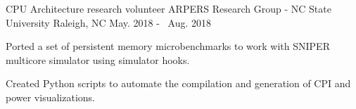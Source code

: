 \par\addvspace{-0.5ex}


\begin{cventries}

  \cventry
    {CPU Architecture research volunteer} %
    {ARPERS Research Group - NC State University} %
    {Raleigh, NC} %
    {\color{darkgray}May. 2018 - \ Aug. 2018} %
    {
      \begin{cvitems} %
        \item {Ported a set of persistent memory microbenchmarks to work with SNIPER multicore simulator using simulator hooks.}
        \item {Created Python scripts to automate the compilation and generation of CPI and power visualizations. }
      \end{cvitems}
    }



\end{cventries}

